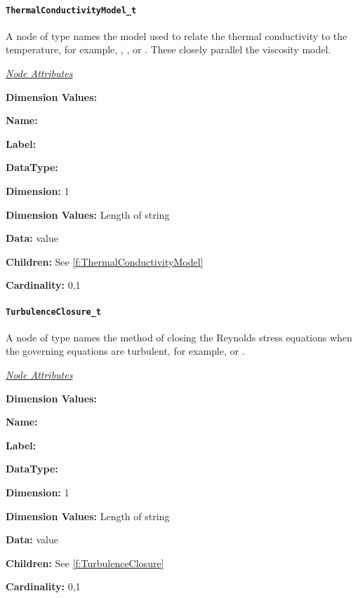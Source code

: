 \paragraph{\texttt{ThermalConductivityModel\_t}}

A node of type  names the model used
to relate the thermal conductivity to the temperature, for example,
, , or . These
closely parallel the viscosity model.

\textit{\uline{Node Attributes}}
\begin{Ventryic}{\textbf{Dimension Values:}}
\item [\textbf{Name:}]
\item [\textbf{Label:}]
\item [\textbf{DataType:}]
\item [\textbf{Dimension:}]
      1
\item [\textbf{Dimension Values:}]
      Length of string
\item [\textbf{Data:}]
       value
\item [\textbf{Children:}]
      See \autoref{f:ThermalConductivityModel}
\item [\textbf{Cardinality:}]
      0,1
\end{Ventryic}

\paragraph{\texttt{TurbulenceClosure\_t}}

\enlargethispage{\baselineskip}%
A node of type  names the method of closing
the Reynolds stress equations when the governing equations are
turbulent, for example,  or
.

\textit{\uline{Node Attributes}}
\begin{Ventryic}{\textbf{Dimension Values:}}
\item [\textbf{Name:}]
\item [\textbf{Label:}]
\item [\textbf{DataType:}]
\item [\textbf{Dimension:}]
      1
\item [\textbf{Dimension Values:}]
      Length of string
\item [\textbf{Data:}]
       value
\item [\textbf{Children:}]
      See \autoref{f:TurbulenceClosure}
\item [\textbf{Cardinality:}]
      0,1
\end{Ventryic}

